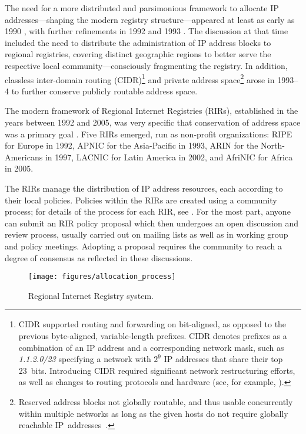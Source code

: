 \documentclass[letter]{sigcomm-alternate}
\begin{document}
The need for a more distributed and parsimonious framework to allocate IP
addresses---shaping the modern registry structure---appeared at least as
early as 1990 \cite{rfc1174}, with further refinements in 1992 and 1993
\cite{rfc1466}. The discussion at that time included the need to distribute
the administration of IP address blocks to regional registries, covering
distinct geographic regions to better serve the respective local
community---consciously fragmenting the registry. In addition, classless 
inter-domain routing (CIDR)\footnote{
  CIDR \cite{rfc1519} supported routing and forwarding on bit-aligned, as
  opposed to the previous byte-aligned, variable-length prefixes.  CIDR
  denotes prefixes as a combination of an IP address and a corresponding
  network mask, such as \textit{1.1.2.0/23} specifying a network with
  $2^{9}$ IP addresses that share their top 23~bits.  Introducing CIDR
  required significant network restructuring efforts, as well as changes to
  routing protocols and hardware (see, for example,
  \cite{Ford:1993:IRA:2329084.2329983}).
} and private address space\footnote{
	Reserved address blocks not
	globally routable, and thus usable
	concurrently within multiple networks as long as the given
	hosts do not require globally reachable IP~addresses~\cite{rfc1597}.
}
arose in 1993--4 to further conserve publicly routable address space.

The modern framework of Regional Internet Registries (RIRs), established in the years between 1992 and
2005, was very specific that conservation of address space was a primary
goal \cite{rfc2050}.  Five RIRs emerged, run as non-profit organizations:
RIPE for Europe in 1992, APNIC for the Asia-Pacific in 1993, ARIN for the
North-Americans in 1997, LACNIC for Latin America in 2002, and AfriNIC for
Africa in 2005.

The RIRs manage the distribution of IP address resources, each according to
their local policies. Policies within the RIRs are created using a community
process; for details of the process for each RIR, see
\cite{arin_policymaking,apnic_policymaking,ripe_policymaking,afrinic_policymaking,lacnic_policymaking}.
For the most part, anyone can submit an RIR policy proposal
which then undergoes an open discussion and review process, usually carried out
on mailing lists as well as in working group and policy meetings.
Adopting a proposal requires the community to reach a degree of consensus as
reflected in these discussions. 

\begin{figure} \centering
\texttt{[image: figures/allocation\_process]}
\caption{Regional Internet Registry system.} 
\vspace{-1em}
\label{fig:rir_framework}
\end{figure}
\end{document}
